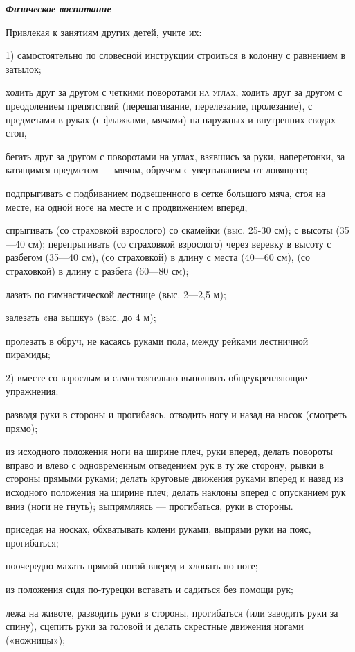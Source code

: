 \documentclass[a5paper]{book}
\renewcommand{\emph}[1]{\textit{#1}}
\begin{document}
\emph{\textbf{Физическое воспитание}}

Привлекая к занятиям других детей, учите их:

1) самостоятельно по словесной инструкции строиться в колонну с
равнением в затылок;

ходить друг за другом с четкими поворотами \textsc{на углах,} ходить
друг за другом с преодолением препятствий (перешагивание, перелезание,
пролезание), с предметами в руках (с флажками, мячами) на наружных и
внутренних сводах стоп,

бегать друг за другом с поворотами на углах, взявшись за руки,
наперегонки, за катящимся предметом --- мячом, обручем с увертыванием от
ловящего;

подпрыгивать с подбиванием подвешенного в сетке большого мяча, стоя на
месте, на одной ноге на месте и с продвижением вперед;

спрыгивать (со страховкой взрослого) со скамейки \textsc{(выс. 25-}30
см); с высоты (35---40 см); перепрыгивать (со страховкой взрослого)
через веревку в высоту с разбегом (35---40 см), (со страховкой) в длину
с места (40---60 см), (со страховкой) в длину с разбега (60---80 см);

лазать по гимнастической лестнице (выс. 2---2,5 м);

залезать «на вышку» (выс. до 4 м);

пролезать в обруч, не касаясь руками пола, между рейками лестничной
пирамиды;

2) вместе со взрослым и самостоятельно выполнять общеукрепляющие
упражнения:

разводя руки в стороны и прогибаясь, отводить ногу и назад на носок
(смотреть прямо);

из исходного положения ноги на ширине плеч, руки вперед, делать повороты
вправо и влево с одновременным отведением рук в ту же сторону, рывки в
стороны прямыми руками; делать круговые движения руками вперед и назад
из исходного положения на ширине плеч; делать наклоны вперед с
опусканием рук вниз (ноги не гнуть); выпрямляясь --- прогибаться, руки в
стороны.

приседая на носках, обхватывать колени руками, выпрями руки на пояс,
прогибаться;

поочередно махать прямой ногой вперед и хлопать по ноге;

из положения сидя по-турецки вставать и садиться без помощи рук;

лежа на животе, разводить руки в стороны, прогибаться (или заводить руки
за спину), сцепить руки за головой и делать скрестные движения ногами
(«ножницы»);
\end{document}
